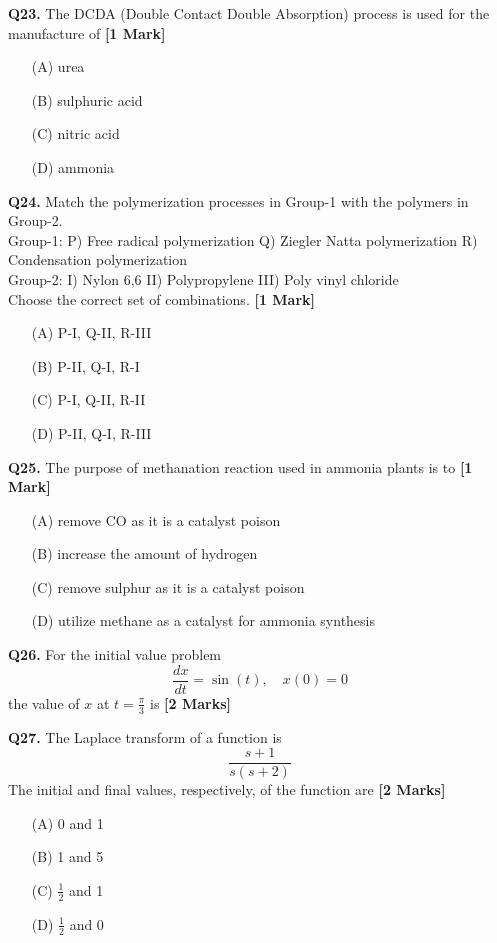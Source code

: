 \documentclass[11pt]{article}
\newcommand{\questiona}[2]{
    \noindent\textbf{Q#2.} #1 \hfill \textbf{[1 Mark]}
}
\newcommand{\questionb}[2]{
    \noindent\textbf{Q#2.} #1 \hfill \textbf{[2 Marks]}
}
\begin{document}
\questiona{The DCDA (Double Contact Double Absorption) process is used for the manufacture of}{23}
\begin{enumerate}
    \item[(A)] urea  
    \item[(B)] sulphuric acid  
    \item[(C)] nitric acid  
    \item[(D)] ammonia  
\end{enumerate}
\vspace{0.5cm}

\questiona{Match the polymerization processes in Group-1 with the polymers in Group-2.  
\\ Group-1: P) Free radical polymerization Q) Ziegler Natta polymerization R) Condensation polymerization  
\\ Group-2: I) Nylon 6,6 II) Polypropylene III) Poly vinyl chloride  
\\ Choose the correct set of combinations.}{24}
\begin{enumerate}
    \item[(A)] P-I, Q-II, R-III  
    \item[(B)] P-II, Q-I, R-I  
    \item[(C)] P-I, Q-II, R-II  
    \item[(D)] P-II, Q-I, R-III  
\end{enumerate}
\vspace{0.5cm}

\questiona{The purpose of methanation reaction used in ammonia plants is to}{25}
\begin{enumerate}
    \item[(A)] remove CO as it is a catalyst poison  
    \item[(B)] increase the amount of hydrogen  
    \item[(C)] remove sulphur as it is a catalyst poison  
    \item[(D)] utilize methane as a catalyst for ammonia synthesis  
\end{enumerate}
\vspace{0.5cm}

\questionb{For the initial value problem  
\[
\frac{dx}{dt} = \sin(t), \quad x(0) = 0
\]  
the value of \( x \) at \( t = \frac{\pi}{3} \) is}{26}
\vspace{0.5cm}

\questionb{The Laplace transform of a function is  
\[
\frac{s+1}{s(s+2)}
\]  
The initial and final values, respectively, of the function are}{27}
\begin{enumerate}
    \item[(A)] 0 and 1  
    \item[(B)] 1 and 5  
    \item[(C)] \( \frac{1}{2} \) and 1  
    \item[(D)] \( \frac{1}{2} \) and 0  
\end{enumerate}
\vspace{0.5cm}
\end{document}
